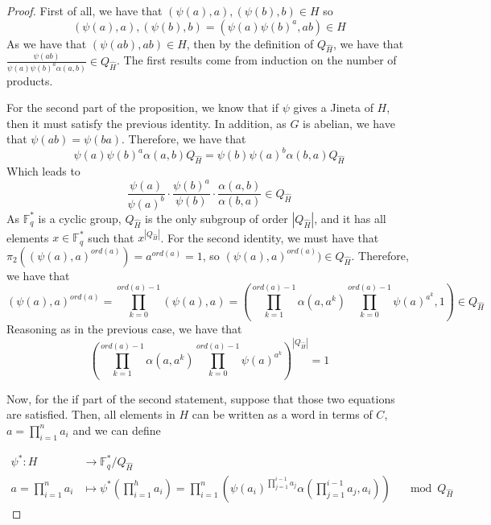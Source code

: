 \documentclass[10pt,a4paper]{amsart}
\begin{document}
\begin{proof}
    First of all, we have that $(\psi(a),a), (\psi(b),b) \in H$ so
    \begin{equation}
        (\psi(a),a), (\psi(b),b) = ( \psi(a) \psi(b)^a, ab) \in H
    \end{equation}
    As we have that $(\psi(ab),ab) \in H$, then by the definition of $Q_{\hat{H}}$, we have that $ \frac{\psi(ab)}{\psi(a) \psi(b)^a \alpha(a,b)} \in Q_{\hat{H}}$. The first results come from induction on the number of products. 

    For the second part of the proposition, we know that if $\psi$ gives a Jineta of $H$, then it must satisfy the previous identity. In addition, as $G$ is abelian, we have that $\psi(ab) = \psi(ba)$. Therefore, we have that 
    \begin{equation}
        \psi(a) \psi(b)^a \alpha(a,b) Q_{\hat{H}} = \psi(b) \psi(a)^b \alpha(b,a)Q_{\hat{H}}
    \end{equation}
 Which leads to 
    \begin{equation}
         \frac{\psi(a)}{\psi(a)^b} \cdot \frac{\psi(b)^a}{\psi(b)} \cdot \frac{\alpha(a,b)}{\alpha(b,a)}  \in Q_{\hat{H}}
    \end{equation}
    As $\mathbb{F}_q^*$ is a cyclic group, $Q_{\hat{H}}$ is the only subgroup of order $ |Q_{\hat{H}}|$, and it has all elements $x\in \mathbb{F}_q^*$ such that $x^{|Q_{\hat{H}}|}$. For the second identity, we must have that $\pi_2((\psi(a),a)^{ord(a)}) = a^{ord(a)} = 1$, so $(\psi(a),a)^{ord(a)}) \in Q_{\hat{H}}$. Therefore, we have that 
    \begin{equation}
        (\psi(a),a)^{ord(a)} = \prod_{k=0}^{ord(a)-1}(\psi(a),a) = \left(\prod_{k=1}^{ord(a)-1}\alpha(a,a^k) \prod_{k=0}^{ord(a)-1} \psi(a)^{a^k}, 1\right) \in Q_{\hat{H}} 
    \end{equation}
    Reasoning as in the previous case, we have that 
    \begin{equation}
        \left(\prod_{k=1}^{ord(a)-1}\alpha(a,a^k) \prod_{k=0}^{ord(a)-1} \psi(a)^{a^k}\right) ^ { |Q_{\hat{H}}|} =1
    \end{equation}

    Now, for the if part of the second statement, suppose that those two equations are satisfied. Then, all elements in $H$ can be written as a word in terms of $C$, $ a=\prod_{i=1}^n a_i$ and we can define
    
    \begin{align*}
    \psi^* :  H &  \longrightarrow \mathbb{F}_q^* / Q_{\hat{H}} \\
        a=\prod_{i=1}^n a_i &\longmapsto \psi^*\left( \prod_{i=1}^h a_i \right) = \prod_{i=1}^{n} \left( \psi(a_i)^{\prod_{j=1}^{i-1} a_j} \alpha\left(\prod_{j=1}^{i-1} a_j, a_i\right)\right) \quad \mod Q_{\hat{H}} 
    \end{align*}
    

\end{proof}
\end{document}
